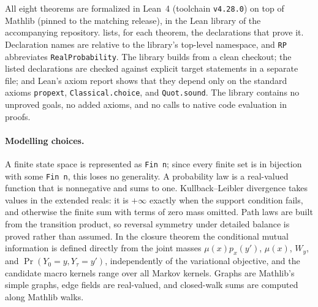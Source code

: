 \documentclass[11pt]{article}
\theoremstyle{definition}
\newcommand{\1}{\mathbf{1}}
\begin{document}
All eight theorems are formalized in Lean~4 (toolchain \texttt{v4.28.0}) on top of Mathlib (pinned to the matching release), in the Lean library of the accompanying repository.
 lists, for each theorem, the declarations that prove it.
Declaration names are relative to the library's top-level namespace, and \texttt{RP} abbreviates \texttt{RealProbability}.
The library builds from a clean checkout; the listed declarations are checked against explicit target statements in a separate file; and Lean's axiom report shows that they depend only on the standard axioms \texttt{propext}, \texttt{Classical.choice}, and \texttt{Quot.sound}.
The library contains no unproved goals, no added axioms, and no calls to native code evaluation in proofs.

\paragraph{Modelling choices.}
A finite state space is represented as \texttt{Fin n}; since every finite set is in bijection with some \texttt{Fin n}, this loses no generality.
A probability law is a real-valued function that is nonnegative and sums to one.
Kullback--Leibler divergence takes values in the extended reals: it is $+\infty$ exactly when the support condition fails, and otherwise the finite sum with terms of zero mass omitted.
Path laws are built from the transition product, so reversal symmetry under detailed balance is proved rather than assumed.
In the closure theorem the conditional mutual information is defined directly from the joint masses $\mu(x)p_x(y')$, $\mu(x)$, $W_y$, and $\Pr(Y_0=y,Y_\tau=y')$, independently of the variational objective, and the candidate macro kernels range over all Markov kernels.
Graphs are Mathlib's simple graphs, edge fields are real-valued, and closed-walk sums are computed along Mathlib walks.
\end{document}
